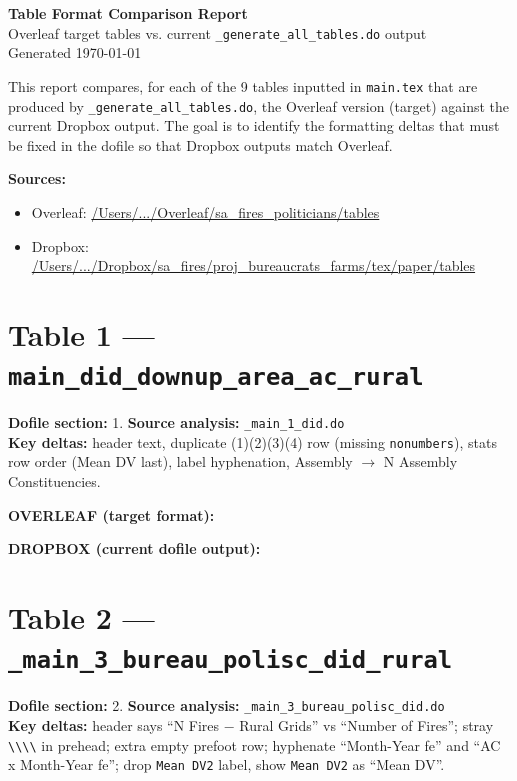 \documentclass[10pt,landscape]{article}
\newcommand{\OV}[1]{%
  \begin{center}
    \colorbox{green!10}{\parbox{0.97\linewidth}{%
      \textbf{\textcolor{green!50!black}{OVERLEAF (target format):}}\par\vspace{0.3em}
      \centering #1
    }}
  \end{center}
}
\newcommand{\DB}[1]{%
  \begin{center}
    \colorbox{red!10}{\parbox{0.97\linewidth}{%
      \textbf{\textcolor{red!60!black}{DROPBOX (current dofile output):}}\par\vspace{0.3em}
      \centering #1
    }}
  \end{center}
}
\newcommand{\OVPATH}{/Users/anzony.quisperojas/Library/CloudStorage/Dropbox/Aplicaciones/Overleaf/sa_fires_politicians/tables}
\newcommand{\DBPATH}{/Users/anzony.quisperojas/Library/CloudStorage/Dropbox/sa_fires/proj_bureaucrats_farms/tex/paper/tables}
\begin{document}
\begin{center}
{\Huge\bfseries Table Format Comparison Report}\\[0.5em]
{\large Overleaf target tables vs. current \texttt{\_generate\_all\_tables.do} output}\\[0.5em]
{\normalsize Generated \today}
\end{center}

\vspace{1em}

\noindent This report compares, for each of the 9 tables inputted in
\texttt{main.tex} that are produced by
\texttt{\_generate\_all\_tables.do}, the Overleaf version (target) against
the current Dropbox output. The goal is to identify the formatting deltas
that must be fixed in the dofile so that Dropbox outputs match Overleaf.

\medskip

\noindent\textbf{Sources:}
\begin{itemize}\itemsep0em
  \item Overleaf: \url{/Users/.../Overleaf/sa_fires_politicians/tables}
  \item Dropbox:  \url{/Users/.../Dropbox/sa_fires/proj_bureaucrats_farms/tex/paper/tables}
\end{itemize}

\newpage

\section{Table 1 --- \texttt{main\_did\_downup\_area\_ac\_rural}}
\noindent\textbf{Dofile section:} 1.\quad
\textbf{Source analysis:} \texttt{\_main\_1\_did.do}\\
\textbf{Key deltas:} header text, duplicate (1)(2)(3)(4) row (missing \texttt{nonumbers}),
stats row order (Mean DV last), label hyphenation, Assembly $\rightarrow$ N Assembly Constituencies.

\OV{}
\DB{}

\newpage

\section{Table 2 --- \texttt{\_main\_3\_bureau\_polisc\_did\_rural}}
\noindent\textbf{Dofile section:} 2.\quad
\textbf{Source analysis:} \texttt{\_main\_3\_bureau\_polisc\_did.do}\\
\textbf{Key deltas:} header says ``N Fires $-$ Rural Grids'' vs ``Number of Fires'';
stray \texttt{\textbackslash\textbackslash\textbackslash\textbackslash} in prehead;
extra empty prefoot row; hyphenate ``Month-Year fe'' and ``AC x Month-Year fe'';
drop \texttt{Mean DV2} label, show \texttt{Mean DV2} as ``Mean DV''.
\end{document}
